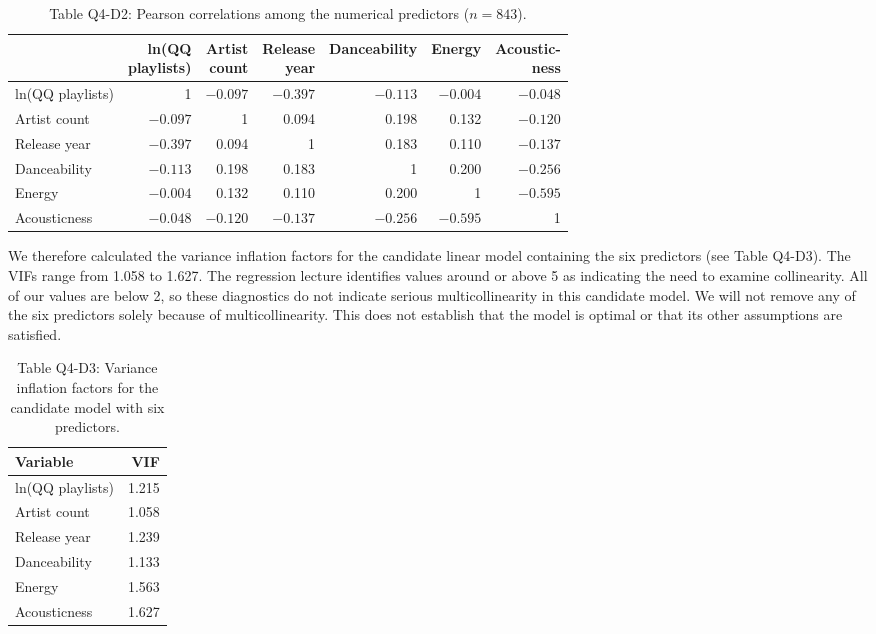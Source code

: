 \begin{table}[htbp]
  \centering
  \small
  \caption*{Table Q4-D2: Pearson correlations among the numerical predictors ($n = 843$).}
  \begin{tabular}{lrrrrrr}
    \toprule
     & \shortstack[l]{ln(QQ\\playlists)} & \shortstack[l]{Artist\\count} & \shortstack[l]{Release\\year} & Danceability & Energy & \shortstack[l]{Acoustic-\\ness} \\
    \midrule
    ln(QQ playlists)      & 1      & $-0.097$ & $-0.397$ & $-0.113$ & $-0.004$ & $-0.048$ \\
    Artist count          & $-0.097$ & 1      & 0.094    & 0.198    & 0.132    & $-0.120$ \\
    Release year          & $-0.397$ & 0.094 & 1        & 0.183    & 0.110    & $-0.137$ \\
    Danceability          & $-0.113$ & 0.198 & 0.183    & 1        & 0.200    & $-0.256$ \\
    Energy                & $-0.004$ & 0.132 & 0.110    & 0.200    & 1        & $-0.595$ \\
    Acousticness          & $-0.048$ & $-0.120$ & $-0.137$ & $-0.256$ & $-0.595$ & 1 \\
    \bottomrule
  \end{tabular}
\end{table}

We therefore calculated the variance inflation factors for the candidate linear model containing the six predictors (see Table Q4-D3). The VIFs range from 1.058 to 1.627. The regression lecture identifies values around or above 5 as indicating the need to examine collinearity. All of our values are below 2, so these diagnostics do not indicate serious multicollinearity in this candidate model. We will not remove any of the six predictors solely because of multicollinearity. This does not establish that the model is optimal or that its other assumptions are satisfied.

\begin{table}[htbp]
  \centering
  \caption*{Table Q4-D3: Variance inflation factors for the candidate model with six predictors.}
  \begin{tabular}{lr}
    \toprule
    Variable & VIF \\
    \midrule
    ln(QQ playlists) & 1.215 \\
    Artist count & 1.058 \\
    Release year & 1.239 \\
    Danceability & 1.133 \\
    Energy & 1.563 \\
    Acousticness & 1.627 \\
    \bottomrule
  \end{tabular}
\end{table}
